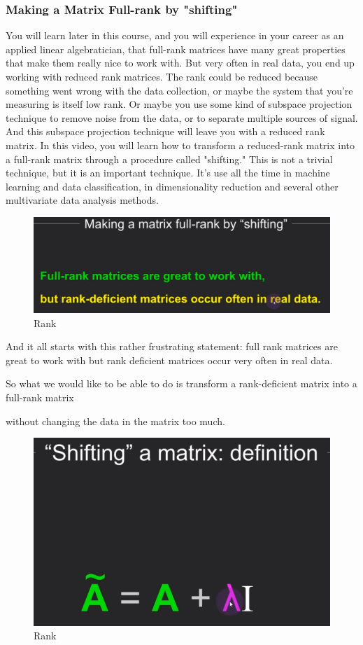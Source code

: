\documentclass[fleqn,10pt]{olplainarticle}
\theoremstyle{definition}
\theoremstyle{remark}
\begin{document}
\pagebreak

\subsubsection*{Making a Matrix Full-rank by "shifting"}

You will learn later in this course, and you will experience in your career as an applied linear algebratician, that full-rank matrices have many great properties that make them really nice to work with. But very often in real data, you end up working with reduced rank matrices. The rank could be reduced because something went wrong with the data collection, or maybe the system that you're measuring is itself low rank. Or maybe you use some kind of subspace projection technique to remove noise from the data, or to separate multiple sources of signal. And this subspace projection technique will leave you with a reduced rank matrix. In this video, you will learn how to transform a reduced-rank matrix into a full-rank matrix through a procedure called "shifting." This is not a trivial technique, but it is an important technique. It's use all the time in machine learning and data classification, in dimensionality reduction and several other multivariate data analysis methods.

\begin{figure}[ht]
	\centering
	\includegraphics[width=0.5\linewidth]{images/rank-28.png}
	\caption{Rank}
	\label{fig:rank_28}
\end{figure}

And it all starts with this rather frustrating statement: full rank matrices are great to work with but rank deficient matrices occur very often in real data.

So what we would like to be able to do is transform a rank-deficient matrix into a full-rank matrix

without changing the data in the matrix too much.

\begin{figure}[ht]
	\centering
	\includegraphics[width=0.3\linewidth]{images/rank-29.png}
	\caption{Rank}
	\label{fig:rank_29}
\end{figure}
\end{document}
